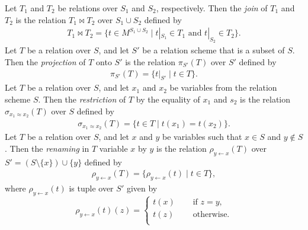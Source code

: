 \documentclass{lmcs}
\newcommand{\st}{%
	\ensuremath{\;|\;}
}
\begin{document}
Let $T_1$ and $T_2$ be relations over $S_1$ and $S_2$, respectively. Then the \emph{join} of $T_1$ and $T_2$ is the relation $T_1\bowtie T_2$ over $S_1\cup S_2$ defined by
\begin{align}
T_1\bowtie T_2=\{t\in M^{S_1\cup S_2}\st t|_{S_1}\in T_1\textrm{ and } t|_{S_2}\in T_2\}.
\end{align}
Let $T$ be a relation over $S$, and let $S'$ be a relation scheme that is a subset of $S$. Then the \emph{projection} of $T$ onto $S'$ is the relation $\pi_{S'}(T)$ over $S'$ defined by
\begin{align}
\pi_{S'}(T)=\{t|_{S'}\st t\in T\}. 
\end{align}
Let $T$ be a relation over $S$, and let $x_1$ and $x_2$ be variables from the relation scheme $S$. Then the \emph{restriction} of $T$ by the equality of $x_1$ and $s_2$ is the relation $\sigma_{x_1\approx x_2}(T)$ over $S$ defined by
\begin{align*}
\sigma_{x_1\approx x_2}(T)=\{t\in T\st t(x_1)=t(x_2)\}.
\end{align*}
Let $T$ be a relation over $S$, and let $x$ and $y$ be variables such that $x\in S$ and $y\notin S$. Then the \emph{renaming} in $T$ variable $x$ by $y$ is the relation $\rho_{y\leftarrow x}(T)$ over $S'=(S\setminus\{x\})\cup\{y\}$ defined by
\begin{align*}
\rho_{y\leftarrow x}(T)=\{\rho_{y\leftarrow x}(t)\st t\in T\}, 
\end{align*}
where $\rho_{y\leftarrow x}(t)$ is tuple over $S'$ given by
\[
\rho_{y\leftarrow x}(t)(z) =
\begin{cases} 
t(x)\quad&\textrm{ if }z=y,\\
t(z) &\textrm{ otherwise}.\\
\end{cases}
\] 
\end{document}
